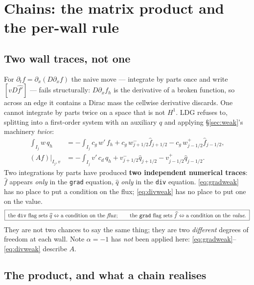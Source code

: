 \documentclass[10pt]{article}
\newcommand{\code}[1]{\texttt{#1}}
\newcommand{\hq}{\widehat{q}}
\newcommand{\hf}{\widehat{f}}
\begin{document}
\section{Chains: the matrix product and the per-wall rule}
\label{sec:chain}

\subsection{Two wall traces, not one}

For $\partial_tf=\partial_x(D\partial_xf)$ the naive move --- integrate by parts
once and write $[vD\widehat{f'}]$ --- fails structurally: $D\partial_xf_h$ is the
derivative of a broken function, so across an edge it contains a Dirac mass the
cellwise derivative discards. One cannot integrate by parts twice on a space that
is not $H^1$. LDG refuses to, splitting into a first-order system with an
auxiliary $q$ and applying \S\ref{sec:weak}'s machinery \emph{twice}:
\begin{align}
  \textstyle\int_{I_j} w\,q_h &= -\textstyle\int_{I_j} c_g\,w'\,f_h
     + c_g\,w^-_{j+1/2}\hf_{j+1/2} - c_g\,w^+_{j-1/2}\hf_{j-1/2},
     \tag{grad}\label{eq:gradweak}\\
  (A f)\big|_{I_j,v} &= -\textstyle\int_{I_j} v'\,c_d\,q_h
     + v^-_{j+1/2}\hq_{j+1/2} - v^+_{j-1/2}\hq_{j-1/2}.
     \tag{div}\label{eq:divweak}
\end{align}
Two integrations by parts have produced \textbf{two independent numerical
traces}: $\hf$ appears \emph{only} in the \code{grad} equation, $\hq$
\emph{only} in the \code{div} equation. \eqref{eq:gradweak} has no place to put a
condition on the flux; \eqref{eq:divweak} has no place to put one on the value.
\begin{equation}
\boxed{\;
  \text{the \code{div} flag sets } \hq \Leftrightarrow \text{a condition on the
  \emph{flux}};\qquad
  \text{the \code{grad} flag sets } \hf \Leftrightarrow \text{a condition on the
  \emph{value}.}\;}
\label{eq:twotraces}
\end{equation}
They are not two chances to say the same thing; they are two \emph{different}
degrees of freedom at each wall. Note $\alpha=-1$ has \emph{not} been applied
here: \eqref{eq:gradweak}--\eqref{eq:divweak} describe $A$.

\subsection{The product, and what a chain realises}
\label{sec:coef}
\end{document}

